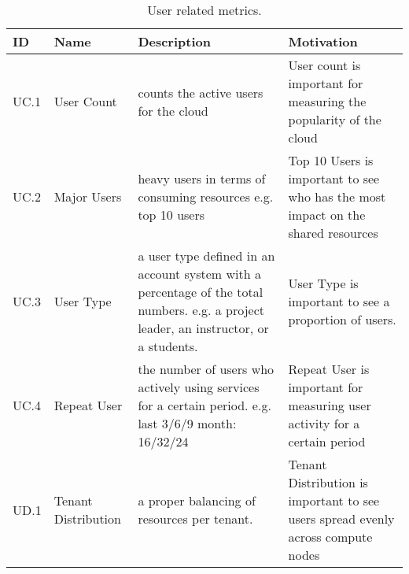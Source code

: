 \begin{table*}[P]
\caption{User related metrics.}
\label{T:metrics-bigtable}
\bigskip
\begin{scriptsize}
\begin{center}
\begin{tabular}{lp{}p{}p{}}
\hline
\rowcolor{blue!20} ID & Name & Description & Motivation \\
\hline
UC.1&
User Count & 
 counts the active users for the cloud &
User count is important for measuring the popularity of the cloud \\
\hline
UC.2&
Major Users &
heavy users in terms of consuming resources e.g. top 10 users &
Top 10 Users is important to see who has the most impact on the shared resources \\
\hline
UC.3 &
User Type &
a user type defined in an account system with a percentage of
the total numbers. e.g. a project leader, an instructor, or a students. & 
User Type is important to see a proportion of users.  \\
\hline
UC.4 &
Repeat User&
the number of users who actively using services for a certain period.  e.g. last 3/6/9 month: 16/32/24 &
Repeat User is important for measuring user activity for a certain period \\
\hline
UD.1 &
Tenant Distribution&
a proper balancing of resources per tenant. &
Tenant Distribution is important to see users spread evenly across compute nodes \\
\hline
\end{tabular}
\end{center}
\end{scriptsize}
\end{table*}


